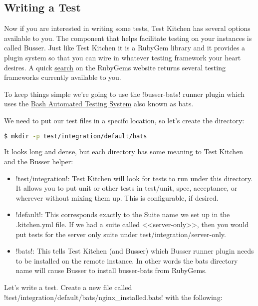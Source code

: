 \subsection{Writing a Test}

Now if you are interested in writing some tests, Test Kitchen has several options available to you. The component that helps facilitate testing on your instances is called Busser. Just like Test Kitchen it is a RubyGem library and it provides a plugin system so that you can wire in whatever testing framework your heart desires. A quick \href{https://rubygems.org/search?utf8=%E2%9C%93&amp;query=busser-}{search} on the RubyGems website returns several testing frameworks currently available to you.

To keep things simple we're going to use the \inline!busser-bats! runner plugin which uses the \href{https://github.com/sstephenson/bats}{Bash Automated Testing System} also known as bats.

We need to put our test files in a specifc location, so let's create the directory:

\begin{lstlisting}[language=Bash,label=lst:testing-test-kitchen13]
$ mkdir -p test/integration/default/bats
\end{lstlisting}

It looks long and dense, but each directory has some meaning to Test Kitchen and the Busser helper:

\begin{itemize}
  \item \inline!test/integration!: Test Kitchen will look for tests to run under this directory. It allows you to put unit or other tests in test/unit, spec, acceptance, or wherever without mixing them up. This is configurable, if desired.
  \item \inline!default!: This corresponds exactly to the Suite name we set up in the .kitchen.yml file. If we had a suite called <<server-only>>, then you would put tests for the server only suite under test/integration/server-only.
  \item \inline!bats!: This tells Test Kitchen (and Busser) which Busser runner plugin needs to be installed on the remote instance. In other words the bats directory name will cause Busser to install busser-bats from RubyGems.
\end{itemize}

Let's write a test. Create a new file called \inline!test/integration/default/bats/nginx_installed.bats! with the following:

